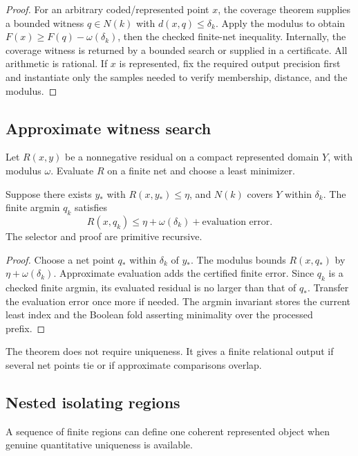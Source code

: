 \begin{proof}
For an arbitrary coded/represented point $x$, the coverage theorem supplies a bounded witness $q\in N(k)$ with $d(x,q)\le\delta_k$.  Apply the modulus to obtain $F(x)\ge F(q)-\omega(\delta_k)$, then the checked finite-net inequality.  Internally, the coverage witness is returned by a bounded search or supplied in a certificate.  All arithmetic is rational.  If $x$ is represented, fix the required output precision first and instantiate only the samples needed to verify membership, distance, and the modulus.
\end{proof}

\subsection{Approximate witness search}

Let $R(x,y)$ be a nonnegative residual on a compact represented domain $Y$, with modulus $\omega$.  Evaluate $R$ on a finite net and choose a least minimizer.

\begin{theorem}
\label{thm:approx-witness}
Suppose there exists $y_*$ with $R(x,y_*)\le\eta$, and $N(k)$ covers $Y$ within $\delta_k$.  The finite argmin $q_k$ satisfies
\[
  R(x,q_k)\le\eta+\omega(\delta_k)+\text{evaluation error}.
\]
The selector and proof are primitive recursive.
\end{theorem}

\begin{proof}
Choose a net point $q_*$ within $\delta_k$ of $y_*$.  The modulus bounds $R(x,q_*)$ by $\eta+\omega(\delta_k)$.  Approximate evaluation adds the certified finite error.  Since $q_k$ is a checked finite argmin, its evaluated residual is no larger than that of $q_*$.  Transfer the evaluation error once more if needed.  The argmin invariant stores the current least index and the Boolean fold asserting minimality over the processed prefix.
\end{proof}

The theorem does not require uniqueness.  It gives a finite relational output if several net points tie or if approximate comparisons overlap.

\subsection{Nested isolating regions}

A sequence of finite regions can define one coherent represented object when genuine quantitative uniqueness is available.

